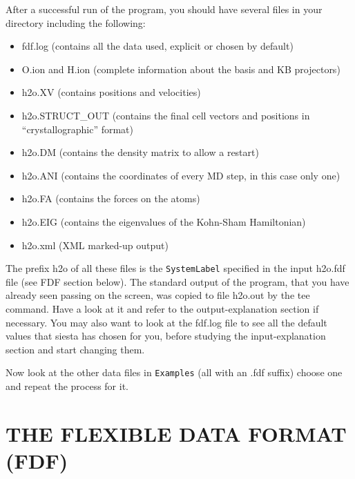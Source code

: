 \documentclass[11pt]{article}
\begin{document}
After a successful run of the program, you should have several
files in your directory including the following:
\begin{itemize}

\item fdf.log
 (contains all the data used, explicit or chosen by default)
\item O.ion and H.ion
 (complete information about the basis and KB projectors)
\item h2o.XV
 (contains positions and velocities)
\item h2o.STRUCT\_OUT
 (contains the final cell vectors and positions in
 ``crystallographic'' format)
\item h2o.DM
 (contains the density matrix to allow a restart)
\item h2o.ANI
 (contains the coordinates of every MD step, in this case only one)
\item h2o.FA
 (contains the forces on the atoms)
\item h2o.EIG
 (contains the eigenvalues of the Kohn-Sham Hamiltonian)
\item h2o.xml
 (XML marked-up output)
\end{itemize}

The prefix h2o of all these files is the 
{\tt SystemLabel}
specified in the input h2o.fdf file (see FDF section below).
The standard output of the program, that you
have already seen passing on the screen, was copied to
file h2o.out by the tee command. Have a look at it
and refer to the output-explanation section if necessary.
You may also want to look at the fdf.log file to see all
the default values that siesta has chosen for you, before
studying the input-explanation section and start changing them.

Now look at the other data files in {\tt Examples}
(all with an .fdf suffix) choose one and repeat the process for it.

\section{THE FLEXIBLE DATA FORMAT (FDF)}
\end{document}

